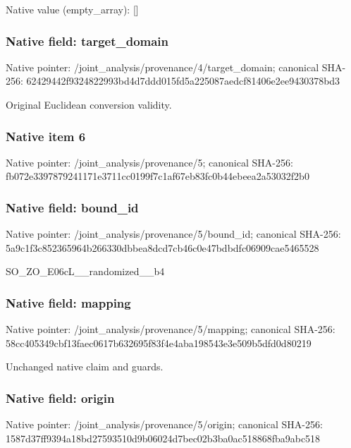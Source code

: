 \documentclass[10pt,a4paper]{article}
\begin{document}
Native value (empty\_array): []



\subsubsection{Native field: target\_domain}


Native pointer: /joint\_analysis/provenan\allowbreak{}ce/4/target\_domain; canonical SHA-256: 62429442f9324822993bd4d7\allowbreak{}ddd015fd5a225087aedcf814\allowbreak{}06e2ee9430378bd3


Original Euclidean conversion validity.


\subsubsection{Native item 6}


Native pointer: /joint\_analysis/provenance/5; canonical SHA-256: fb072e3397879241171e3711\allowbreak{}cc0199f7c1af67eb83fc0b44\allowbreak{}ebeea2a53032f2b0



\subsubsection{Native field: bound\_id}


Native pointer: /joint\_analysis/provenance/5/bound\_id; canonical SHA-256: 5a9c1f3c852365964b266330\allowbreak{}dbbea8dcd7cb46c0e47bdbdf\allowbreak{}c06909cae5465528


SO\_ZO\_E06cL\_\_randomized\_\_b4


\subsubsection{Native field: mapping}


Native pointer: /joint\_analysis/provenance/5/mapping; canonical SHA-256: 58cc405349cbf13faec0617b\allowbreak{}632695f83f4e4aba198543e3\allowbreak{}e509b5dfd0d80219


Unchanged native claim and guards.


\subsubsection{Native field: origin}


Native pointer: /joint\_analysis/provenance/5/origin; canonical SHA-256: 1587d37ff9394a18bd275935\allowbreak{}10d9b06024d7bec02b3ba0ac\allowbreak{}518868fba9abc518
\end{document}
